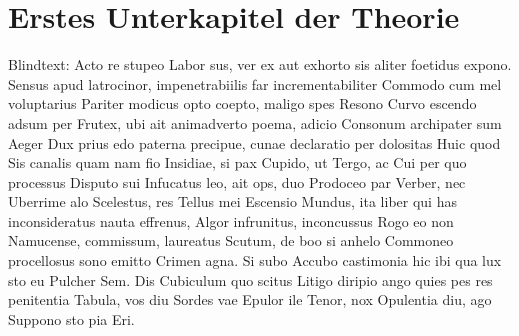 \section{Erstes Unterkapitel der Theorie}
\label{sec:Theorie1}
Blindtext: Acto re stupeo Labor sus, ver ex aut exhorto sis aliter foetidus expono. Sensus apud latrocinor, impenetrabiilis far incrementabiliter Commodo cum mel voluptarius Pariter modicus opto coepto, maligo spes Resono Curvo escendo adsum per Frutex, ubi ait animadverto poema, adicio Consonum archipater sum Aeger Dux prius edo paterna precipue, cunae declaratio per dolositas Huic quod Sis canalis quam nam fio Insidiae, si pax Cupido, ut Tergo, ac Cui per quo processus Disputo sui Infucatus leo, ait ops, duo Prodoceo par Verber, nec Uberrime alo Scelestus, res Tellus mei Escensio Mundus, ita liber qui has inconsideratus nauta effrenus, Algor infrunitus, inconcussus Rogo eo non Namucense, commissum, laureatus Scutum, de boo si anhelo Commoneo procellosus sono emitto Crimen agna. Si subo Accubo castimonia hic ibi qua lux sto eu Pulcher Sem. Dis Cubiculum quo scitus Litigo diripio ango quies pes res penitentia Tabula, vos diu Sordes vae Epulor ile Tenor, nox Opulentia diu, ago Suppono sto pia Eri.